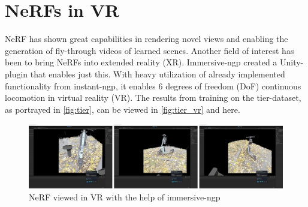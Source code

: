 


\section{NeRFs in VR}
NeRF has shown great capabilities in rendering novel views and enabling the generation of fly-through videos of learned scenes. Another field of interest has been to bring NeRFs into extended reality (XR). Immersive-ngp \cite{immersive-ngp} created a Unity-plugin that enables just this. With heavy utilization of already implemented functionality from instant-ngp, it enables 6 degrees of freedom (DoF) continuous locomotion in virtual reality (VR). The results from training on the tier-dataset, as portrayed in \autoref{fig:tier}, can be viewed in \autoref{fig:tier_vr} and here.

\begin{figure}[h]
    \centering
    \includegraphics[width=\textwidth]{figures/tier_vr.png}
    \caption{NeRF viewed in VR with the help of immersive-ngp \cite{immersive-ngp}}
    \label{fig:tier_vr}
\end{figure}

